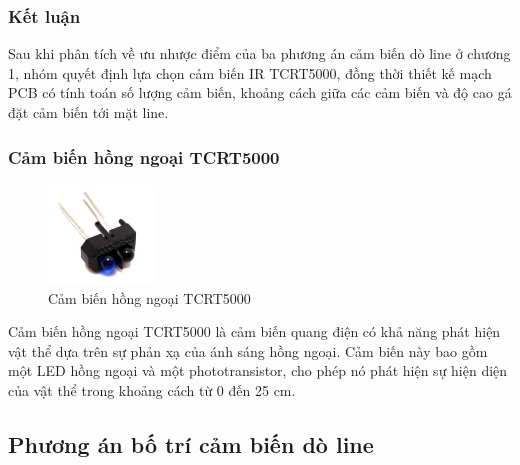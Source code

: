             \subsubsection{Kết luận}
                \hspace*{0.6cm}Sau khi phân tích về ưu nhược điểm của ba phương án cảm biến dò line ở chương 
                                1, nhóm quyết định lựa chọn cảm biến IR TCRT5000, đồng thời thiết kế mạch PCB có 
                                tính toán số lượng cảm biến, khoảng cách giữa các cảm biến và độ cao gá đặt cảm biến tới mặt line.
            \subsubsection{Cảm biến hồng ngoại TCRT5000}
                \begin{figure}[H]
                    \centering
                    \includegraphics[width=0.25\textwidth]{pictures/chapter2/chapter2_pic_6.png}
                    \caption{Cảm biến hồng ngoại TCRT5000}
                    \label{fig:tcrt5000}
                \end{figure}
                \hspace*{0.6cm}Cảm biến hồng ngoại TCRT5000 là cảm biến quang điện có khả năng phát hiện vật thể dựa trên sự phản xạ của ánh sáng hồng ngoại. Cảm biến này bao gồm một LED hồng ngoại và một phototransistor, cho phép nó phát hiện sự hiện diện của vật thể trong khoảng cách từ 0 đến 25 cm. 
        \subsection{Phương án bố trí cảm biến dò line}
